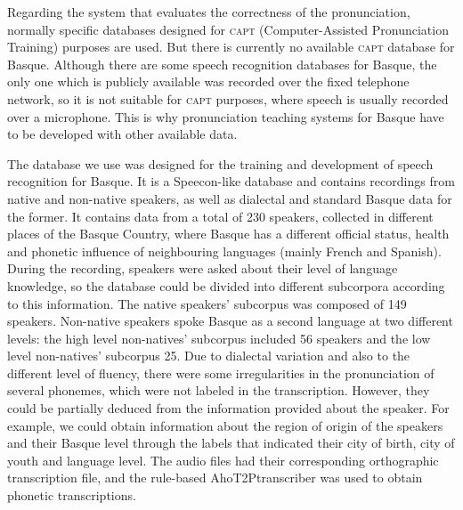 \documentclass[output=paper]{LSP/langsci}
\begin{document}
Regarding the system that evaluates the correctness of the pronunciation, normally specific databases designed for \textsc{capt} (Computer-Assisted Pronunciation Training) purposes are used. But there is currently no available \textsc{capt} database for Basque. Although there are some speech recognition databases for Basque, the only one which is publicly available \citep{HernáezEtAl2003} was recorded over the fixed telephone network, so it is not suitable for \textsc{capt} purposes, where speech is usually recorded over a microphone. This is why pronunciation teaching systems for Basque have to be developed with other available data. 

The database we use was designed for the training and development of speech recognition for Basque. It is a Speecon-like database \citep{SiemundEtAl2000} and contains recordings from native and non-native speakers, as well as dialectal and standard Basque data for the former. It contains data from a total of 230 speakers, collected in different places of the Basque Country, where Basque has a different official status, health and phonetic influence of neighbouring languages (mainly French and Spanish). During the recording, speakers were asked about their level of language knowledge, so the database could be divided into different subcorpora according to this information. The native speakers' subcorpus was composed of 149 speakers. Non-native speakers spoke Basque as a second language at two different levels: the high level non-natives' subcorpus included 56 speakers and the low level non-natives' subcorpus 25. Due to dialectal variation and also to the different level of fluency, there were some irregularities in the pronunciation of several phonemes, which were not labeled in the transcription. However, they could be partially deduced from the information provided about the speaker. For example, we could obtain information about the region of origin of the speakers and their Basque level through the labels that indicated their city of birth, city of youth and language level. The audio files had their corresponding orthographic transcription file, and the rule-based AhoT2Ptranscriber was used to obtain phonetic transcriptions.
\end{document}
